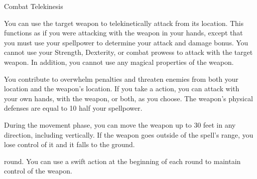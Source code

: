 \begin{spellsection}{Combat Telekinesis}
    \begin{spellheader}
    \end{spellheader}
    \begin{spellcontent}
        \begin{spelltargetinginfo}
            \spellrng{\rngclose}
        \end{spelltargetinginfo}
        \begin{spelleffects}
            \spelleffect You can use the target weapon to telekinetically attack from its location.
            This functions as if you were attacking with the weapon in your hands, except that you must use your spellpower to determine your attack and damage bonus.
            You cannot use your Strength, Dexterity, or combat prowess to attack with the target weapon.
            In addition, you cannot use any magical properties of the weapon.

            You contribute to overwhelm penalties and threaten enemies from both your location and the weapon's location.
            If you take a  action, you can attack with your own hands, with the weapon, or both, as you choose.
            The weapon's physical defenses are equal to 10 \add half your spellpower.

            During the movement phase, you can move the weapon up to 30 feet in any direction, including vertically.
            If the weapon goes outside of the spell's range, you lose control of it and it falls to the ground.

             round. You can use a swift action at the beginning of each round to maintain control of the weapon.
        \end{spelleffects}
    \end{spellcontent}
    \begin{spellfooter}
    \end{spellfooter}
\end{spellsection}


